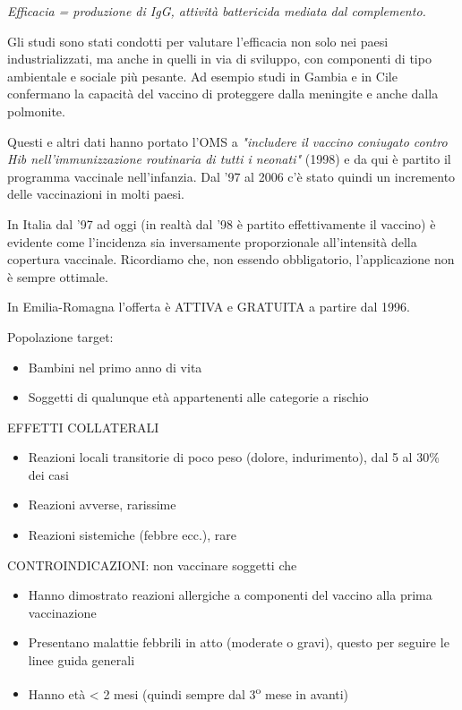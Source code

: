   \emph{Efficacia = produzione di IgG, attività battericida mediata dal
  complemento.}

  Gli studi sono stati condotti per valutare l'efficacia non solo nei
  paesi industrializzati, ma anche in quelli in via di sviluppo, con
  componenti di tipo ambientale e sociale più pesante. Ad esempio studi
  in Gambia e in Cile confermano la capacità del vaccino di proteggere
  dalla meningite e anche dalla polmonite.

  Questi e altri dati hanno portato l'OMS a \emph{"includere il vaccino
  coniugato contro Hib nell'immunizzazione routinaria di tutti i
  neonati"} (1998) e da qui è partito il programma vaccinale
  nell'infanzia. Dal '97 al 2006 c'è stato quindi un incremento delle
  vaccinazioni in molti paesi.

  In Italia dal '97 ad oggi (in realtà dal '98 è partito effettivamente
  il vaccino) è evidente come l'incidenza sia inversamente proporzionale
  all'intensità della copertura vaccinale. Ricordiamo che, non essendo
  obbligatorio, l'applicazione non è sempre ottimale.

  In Emilia-Romagna l'offerta è ATTIVA e GRATUITA a partire dal 1996.

  Popolazione target:

\begin{itemize}
\item
  Bambini nel primo anno di vita
\item
  Soggetti di qualunque età appartenenti alle categorie a rischio
\end{itemize}
  EFFETTI COLLATERALI

\begin{itemize}
\item
  Reazioni locali transitorie di poco peso (dolore, indurimento), dal 5
  al 30\% dei casi
\item
  Reazioni avverse, rarissime
\item
  Reazioni sistemiche (febbre ecc.), rare
\end{itemize}
 
  CONTROINDICAZIONI: non vaccinare soggetti che

\begin{itemize}
\item
  Hanno dimostrato reazioni allergiche a componenti del vaccino alla
  prima vaccinazione
\item
  Presentano malattie febbrili in atto (moderate o gravi), questo per
  seguire le linee guida generali
\item
  Hanno età \textless{} 2 mesi (quindi sempre dal 3\textsuperscript{o} mese in avanti)
\end{itemize}
